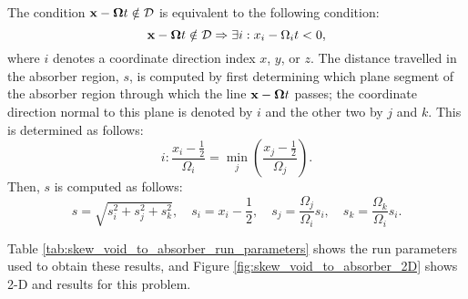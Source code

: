 The condition $\mathbf{x}-\mathbf{\Omega}t\notin\mathcal{D}$ is equivalent to the
following condition:
\[
   \mathbf{x}-\mathbf{\Omega}t\notin\mathcal{D} \Rightarrow
   \exists i: x_i-\Omega_i t < 0,
\]
where $i$ denotes a coordinate direction index $x$, $y$, or $z$.
The distance travelled in the absorber region, $s$, is computed
by first determining which plane segment of the absorber region
through which the line $\mathbf{x}-\mathbf{\Omega}t$ passes; the coordinate
direction normal to this plane is denoted by $i$ and the other
two by $j$ and $k$. This is determined as follows:
\[
   i: \frac{x_i-\frac{1}{2}}{\Omega_i} = \min\limits_j\left(
      \frac{x_j-\frac{1}{2}}{\Omega_j}\right).
\]
Then, $s$ is computed as follows:
\[
   s=\sqrt{s_i^2 + s_j^2 + s_k^2}, \quad
   s_i=x_i-\frac{1}{2}, \quad
   s_j=\frac{\Omega_j}{\Omega_i}s_i, \quad
   s_k=\frac{\Omega_k}{\Omega_i}s_i.
\]

Table \ref{tab:skew_void_to_absorber_run_parameters} shows the run parameters used
to obtain these results, and Figure \ref{fig:skew_void_to_absorber_2D}
shows 2-D and results for this problem.

